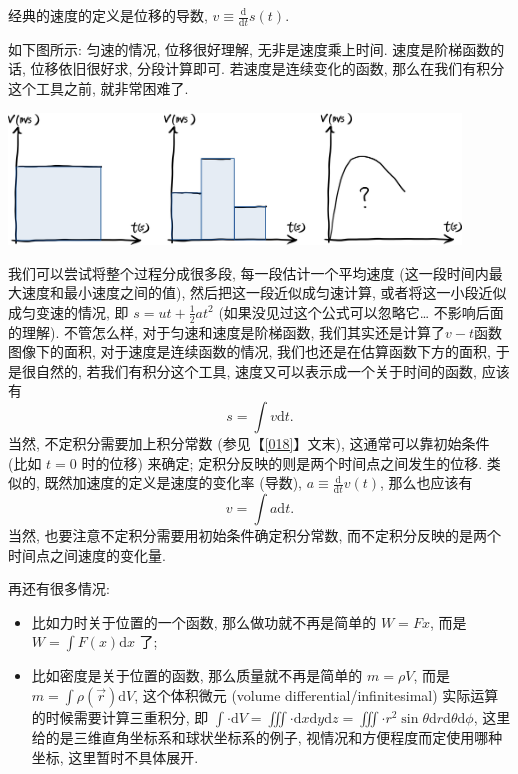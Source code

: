 \begin{tcolorbox}[size=fbox, breakable, enhanced jigsaw, title={应用? - 和物理的联系}]

经典的速度的定义是位移的导数,
\(v\equiv \frac{\mathrm{d}}{\mathrm{d}t}s(t)\).

如下图所示: 匀速的情况, 位移很好理解, 无非是速度乘上时间.
速度是阶梯函数的话, 位移依旧很好求, 分段计算即可.
若速度是连续变化的函数, 那么在我们有积分这个工具之前, 就非常困难了.

\begin{tcolorbox}[size=fbox, breakable, enhanced jigsaw]
\includegraphics[width=0.9\textwidth]{img/image-20230912164801681.png}
\end{tcolorbox}

我们可以尝试将整个过程分成很多段, 每一段估计一个平均速度
(这一段时间内最大速度和最小速度之间的值), 然后把这一段近似成匀速计算,
或者将这一小段近似成匀变速的情况, 即 \(s=ut+\frac{1}{2}at^2\)
(如果没见过这个公式可以忽略它\ldots{} 不影响后面的理解). 不管怎么样,
对于匀速和速度是阶梯函数, 我们其实还是计算了\(v-t\)函数图像下的面积,
对于速度是连续函数的情况, 我们也还是在估算函数下方的面积, 于是很自然的,
若我们有积分这个工具, 速度又可以表示成一个关于时间的函数, 应该有 \[
s=\int v\mathrm{d}t.
\] 当然, 不定积分需要加上积分常数 (参见【\ref{018}】文末),
这通常可以靠初始条件 (比如 \(t=0\) 时的位移) 来确定;
定积分反映的则是两个时间点之间发生的位移. 类似的,
既然加速度的定义是速度的变化率 (导数),
\(a\equiv \frac{\mathrm{d}}{\mathrm{d}t}v(t)\), 那么也应该有 \[
v=\int a\mathrm{d}t.
\] 当然, 也要注意不定积分需要用初始条件确定积分常数,
而不定积分反映的是两个时间点之间速度的变化量.

再还有很多情况:

\begin{itemize}
\item
  比如力时关于位置的一个函数, 那么做功就不再是简单的 \(W=Fx\), 而是
  \(W=\int F(x)\mathrm{d}x\) 了;
\item
  比如密度是关于位置的函数, 那么质量就不再是简单的 \(m=\rho V\), 而是
  \(m=\int \rho(\vec{r})\mathrm{d}V\), 这个体积微元 (volume
  differential/infinitesimal) 实际运算的时候需要计算三重积分, 即
  \(\int\cdot\mathrm{d}V=\iiint\cdot\mathrm{d}x\mathrm{d}y\mathrm{d}z=\iiint\cdot r^2\sin\theta\mathrm{d}r\mathrm{d}\theta\mathrm{d}\phi\),
  这里给的是三维直角坐标系和球状坐标系的例子,
  视情况和方便程度而定使用哪种坐标, 这里暂时不具体展开.
\end{itemize}
\end{tcolorbox}